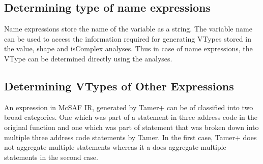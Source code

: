 \subsection{Determining type of name expressions}
Name expressions store the name of the variable as a string. The variable name can be used to access the information required for generating VTypes stored in the value, shape and isComplex analyses. Thus in case of name expressions, the VType can be determined directly using the analyses. 

\subsection{Determining VTypes of Other Expressions}
An expression in McSAF IR, generated by Tamer+ can be of classified into two broad categories. One which was part of a statement in three address code in the original \matlab function and one which was part of statement that was broken down into multiple three address code statements by Tamer. In the first case, Tamer+ does not aggregate multiple statements whereas it a does aggregate multiple statements in the second case.  

